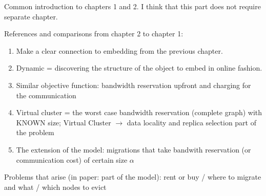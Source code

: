 Common introduction to chapters 1 and 2. I think that this part does not require separate chapter.


References and comparisons from chapter 2 to chapter 1:
\begin{enumerate}
  \item Make a clear connection to embedding from the previous chapter.
  \item Dynamic = discovering the structure of the object to embed in online fashion.
  \item Similar objective function: bandwidth reservation upfront and charging for the communication
  \item Virtual cluster = the worst case bandwidth reservation (complete graph) with KNOWN size; Virtual Cluster $\rightarrow$ data locality and replica selection part of the problem
  \item The extension of the model: migrations that take bandwith reservation (or communication cost) of certain size $\alpha$
\end{enumerate}
Problems that arise (in paper: part of the model): rent or buy / where to migrate and what / which nodes to evict

